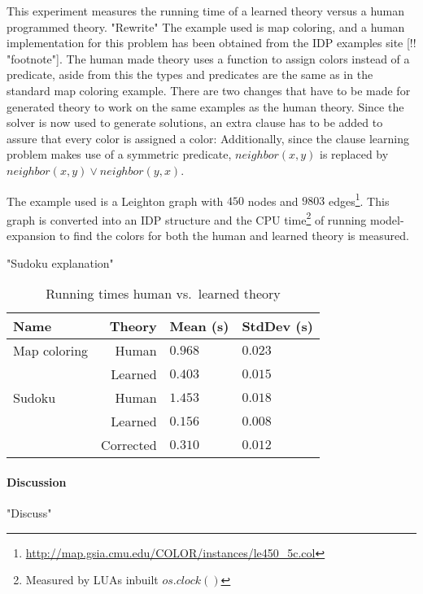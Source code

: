 \begin{experiment}
	This experiment measures the running time of a learned theory versus a human programmed theory.
	"Rewrite"
	The example used is map coloring, and a human implementation for this problem has been obtained from the IDP examples site [!! "footnote"].
	The human made theory uses a function to assign colors instead of a predicate, aside from this the types and predicates are the same as in the standard map coloring example.
	There are two changes that have to be made for generated theory to work on the same examples as the human theory.
	Since the solver is now used to generate solutions, an extra clause has to be added to assure that every color is assigned a color:
	Additionally, since the clause learning problem makes use of a symmetric predicate, $\mathit{neighbor}(x, y)$ is replaced by $\mathit{neighbor}(x, y) \lor \mathit{neighbor(y,x)}$.

	The example used is a Leighton graph with $450$ nodes and $9803$ edges\footnote{\url{http://map.gsia.cmu.edu/COLOR/instances/le450_5c.col}}.
	This graph is converted into an IDP structure and the CPU time\footnote{Measured by LUAs inbuilt $os.clock()$} of running model-expansion to find the colors for both the human and learned theory is measured.

	"Sudoku explanation"

	\begin{table}[!htp]
		\begin{tabularx}{\textwidth}{lr|XX}
			\textbf{Name} & \textbf{Theory} & \textbf{Mean (s)} & \textbf{StdDev (s)} \\
			\toprule
			Map coloring & Human & $0.968$ & $0.023$ \\
			& Learned & $0.403$ & $0.015$ \\
			\midrule
			Sudoku & Human & $1.453$ & $0.018$ \\ 
			& Learned & $0.156$ & $0.008$ \\
			& Corrected & $0.310$ & $0.012$
		\end{tabularx}
		\label{tbl:speed_human_machine}
		\caption{Running times human vs.~learned theory}
	\end{table}

\end{experiment}

\paragraph{Discussion}
"Discuss"

